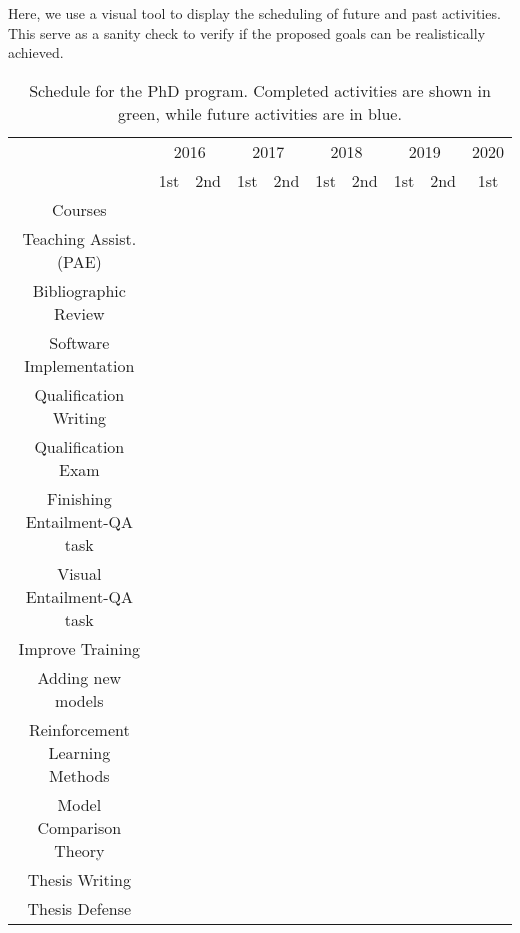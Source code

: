 Here, we use a visual tool to display the scheduling of future and past activities. This serve as a sanity check to verify if the
proposed goals can be realistically achieved.

\begin{table}[ht!]
  \center
  \begin{tabular}{|c|c|c|c|c|c|c|c|c|c|}\hline
    & \multicolumn{2}{c|}{2016} & \multicolumn{2}{c|}{2017} & \multicolumn{2}{c|}{2018} & \multicolumn{2}{c|}{2019} & \multicolumn{1}{c|}{2020} \\ \cline{2-10}
    \raisebox{1.5ex}{Activity} & 1st & 2nd & 1st & 2nd & 1st & 2nd & 1st & 2nd & 1st \\ \hline \hline
    Courses & \cellcolor{green!45} & \cellcolor{green!45} & \cellcolor{green!45}  & \cellcolor{green!45}  &  &  & & & \\ \hline
    Teaching Assist. (PAE) & & &  &  &\cellcolor{green!45}  &  & & & \\ \hline
    Bibliographic Review & \cellcolor{green!45} & \cellcolor{green!45} & \cellcolor{green!45} & \cellcolor{green!45} & \cellcolor{green!45} & &  &  & \\ \hline 
    Software Implementation & & & & \cellcolor{green!45} &\cellcolor{green!45}  & \cellcolor{blue!45} &\cellcolor{blue!45}&\cellcolor{blue!45}& \\ \hline
    Qualification Writing & & & & & \cellcolor{green!45} & &  & & \\ \hline
    Qualification Exam & & & & & \cellcolor{green!45} & & & & \\ \hline
    Finishing Entailment-QA task & & & & & & \cellcolor{blue!45} &  & & \\ \hline
    Visual Entailment-QA task & & & & & & \cellcolor{blue!45} & \cellcolor{blue!45}  & & \\ \hline
    Improve Training & & & & & & \cellcolor{blue!45} &  & & \\ \hline
    Adding new models & & & & & & \cellcolor{blue!45} &\cellcolor{blue!45}  & & \\ \hline
    Reinforcement Learning Methods & & & & & & &\cellcolor{blue!45}  &\cellcolor{blue!45} & \\ \hline
    Model Comparison Theory & & & & & & &\cellcolor{blue!45}  &\cellcolor{blue!45} & \\ \hline
    Thesis Writing & & & & & & & & \cellcolor{blue!45} & \\ \hline
    Thesis Defense & & & & & & & & & \cellcolor{blue!45}  \\ \hline
  \end{tabular}
  \caption{Schedule for the PhD program. Completed activities are shown in green, while future activities are in blue.}
  \label{tab:schedule}
\end{table}